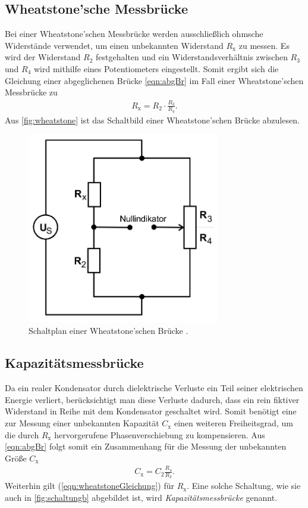 \subsection{Wheatstone'sche Messbrücke}
Bei einer Wheatstone'schen Messbrücke werden ausschließlich ohmsche Widerstände verwendet, um einen unbekannten Widerstand 
$R_{\text{x}}$ zu messen. Es wird der Widerstand $R_2$ festgehalten und ein Widerstandsverhältnis zwischen 
$R_3$ und $R_4$ wird mithilfe eines Potentiometers eingestellt. Somit ergibt sich die Gleichung einer abgeglichenen Brücke 
\ref{eqn:abgBr} im Fall einer Wheatstone'schen Messbrücke zu
\begin{align}
    R_{\text{x}} = R_2 \cdot \frac{R_3}{R_4}.
    \label{eqn:wheatstoneGleichung}
\end{align}
Aus \autoref{fig:wheatstone} ist das Schaltbild einer Wheatstone'schen Brücke abzulesen.
\begin{figure}[H]
    \centering
    \includegraphics[width=0.75\textwidth]{dateien/wheatstoneBruecke.png}
    \caption{Schaltplan einer Wheatstone'schen Brücke \cite{anleitung}.}
    \label{fig:wheatstone}
\end{figure}


\subsection{Kapazitätsmessbrücke}
Da ein realer Kondensator durch dielektrische Verluste ein Teil seiner elektrischen Energie verliert, berücksichtigt
man diese Verluste dadurch, dass ein rein fiktiver Widerstand in Reihe mit dem Kondensator geschaltet wird.
Somit benötigt eine zur Messung einer unbekannten Kapazität $C_{\text{x}}$ einen weiteren Freiheitsgrad, um
die durch $R_{\text{x}}$ hervorgerufene Phasenverschiebung zu kompensieren. 
Aus \autoref{eqn:abgBr} folgt somit ein Zusammenhang für die Messung der unbekannten Größe $C_{\text{x}}$
\begin{align}
    C_{\text{x}} = C_2 \frac{R_4}{R_3}.
    \label{eqn:kapazitaetsmess}
\end{align}
Weiterhin gilt (\ref{eqn:wheatstoneGleichung}) für $R_{\text{x}}$.
Eine solche Schaltung, wie sie auch in
\autoref{fig:schaltungb} abgebildet ist, wird \textit{Kapazitätsmessbrücke} genannt.

